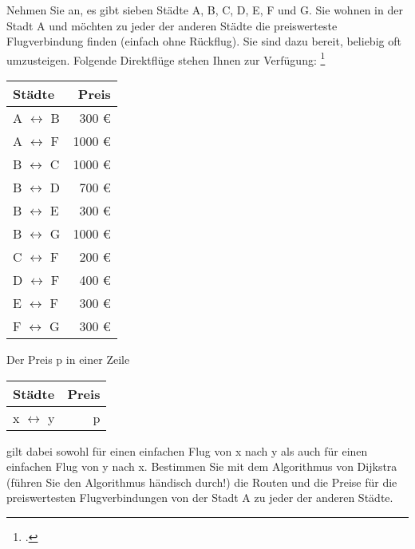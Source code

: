 \documentclass{bschlangaul-aufgabe}
\begin{document}

Nehmen Sie an, es gibt sieben Städte A, B, C, D, E, F und G. Sie wohnen
in der Stadt A und möchten zu jeder der anderen Städte die preiswerteste
Flugverbindung finden (einfach ohne Rückflug). Sie sind dazu bereit,
beliebig oft umzusteigen. Folgende Direktflüge stehen Ihnen zur
Verfügung:
\footcite[Seite 1, Aufgabe 1: Dijkstra]{aud:ab:6}

\begin{center}
\begin{tabular}{l|r}
Städte & Preis \\\hline
A $\leftrightarrow$ B & 300 € \\
A $\leftrightarrow$ F & 1000 € \\
B $\leftrightarrow$ C & 1000 € \\
B $\leftrightarrow$ D & 700 € \\
B $\leftrightarrow$ E & 300 € \\
B $\leftrightarrow$ G & 1000 € \\
C $\leftrightarrow$ F & 200 € \\
D $\leftrightarrow$ F & 400 € \\
E $\leftrightarrow$ F & 300 € \\
F $\leftrightarrow$ G & 300 € \\
\end{tabular}
\end{center}

\noindent
Der Preis p in einer Zeile

\begin{center}
\begin{tabular}{l|r}
Städte & Preis \\\hline
x $\leftrightarrow$ y & p \\
\end{tabular}
\end{center}

\noindent
gilt dabei sowohl für einen einfachen Flug von x nach y als auch für
einen einfachen Flug von y nach x. Bestimmen Sie mit dem Algorithmus von
Dijkstra (führen Sie den Algorithmus händisch durch!) die Routen und die
Preise für die preiswertesten Flugverbindungen von der Stadt A zu jeder
der anderen Städte.
\end{document}
